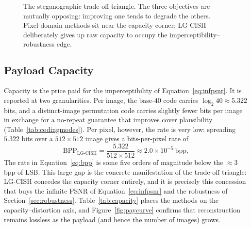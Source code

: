 \documentclass[11pt]{article}
\begin{document}
\begin{figure}[H]
\centering
{}
\caption{The steganographic trade-off triangle. The three objectives are mutually
opposing: improving one tends to degrade the others. Pixel-domain methods sit near
the capacity corner; LG-CISH deliberately gives up raw capacity to occupy the
imperceptibility--robustness edge.}
\label{fig:tradeoff}
\end{figure}

\subsection{Payload Capacity}\label{sec:rescap}
Capacity is the price paid for the imperceptibility of Equation~\eqref{eq:infpsnr}.
It is reported at two granularities. Per image, the base-$40$ code carries
$\log_2 40\approx5.322$ bits, and a distinct-image permutation code carries slightly
fewer bits per image in exchange for a no-repeat guarantee that improves cover
plausibility (Table~\ref{tab:codingmodes}). Per pixel, however, the rate is very
low: spreading $5.322$ bits over a $512\times512$ image gives a bits-per-pixel rate
of
\begin{equation}
  \mathrm{BPP}_{\text{LG-CISH}}=\frac{5.322}{512\times512}\approx 2.0\times10^{-5}\ \text{bpp},
  \label{eq:bpp}
\end{equation}
The rate in Equation~\eqref{eq:bpp} is some five orders of magnitude below the
$\approx 3$\,bpp of LSB. This large gap is
the concrete manifestation of the trade-off triangle: LG-CISH concedes the capacity
corner entirely, and it is precisely this concession that buys the infinite PSNR of
Equation~\eqref{eq:infpsnr} and the robustness of Section~\ref{sec:robustness}.
Table~\ref{tab:capacity} places the methods on the capacity--distortion axis, and
Figure~\ref{fig:paycurve} confirms that reconstruction remains lossless as the
payload (and hence the number of images) grows.
\end{document}
